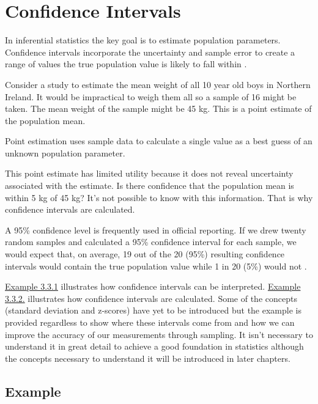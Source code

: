 \documentclass[
]{book}
\begin{document}
\hypertarget{confint}{%
\section{Confidence Intervals}\label{confint}}

In inferential statistics the key goal is to estimate population parameters. Confidence intervals incorporate the uncertainty and sample error to create a range of values the true population value is likely to fall within \citep{Frost2019}.

Consider a study to estimate the mean weight of all 10 year old boys in Northern Ireland. It would be impractical to weigh them all so a sample of 16 might be taken. The mean weight of the sample might be 45 kg. This is a point estimate of the population mean.

Point estimation uses sample data to calculate a single value as a best guess of an unknown population parameter.

This point estimate has limited utility because it does not reveal uncertainty associated with the estimate. Is there confidence that the population mean is within 5 kg of 45 kg? It's not possible to know with this information. That is why confidence intervals are calculated.

A 95\% confidence level is frequently used in official reporting. If we drew twenty random samples and calculated a 95\% confidence interval for each sample, we would expect that, on average, 19 out of the 20 (95\%) resulting confidence intervals would contain the true population value while 1 in 20 (5\%) would not \citep{uncertainty}.

\protect\hyperlink{example1}{Example 3.3.1} illustrates how confidence intervals can be interpreted. \protect\hyperlink{example2}{Example 3.3.2.} illustrates how confidence intervals are calculated. Some of the concepts (standard deviation and z-scores) have yet to be introduced but the example is provided regardless to show where these intervals come from and how we can improve the accuracy of our measurements through sampling. It isn't necessary to understand it in great detail to achieve a good foundation in statistics although the concepts necessary to understand it will be introduced in later chapters.

\hypertarget{example1}{%
\subsection{Example}\label{example1}}
\end{document}

